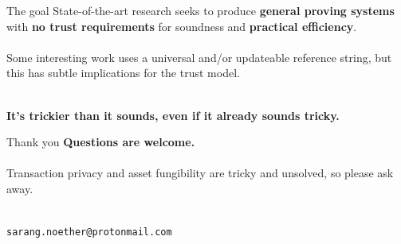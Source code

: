 \documentclass[aspectratio=169]{beamer}
\begin{document}
\begin{frame}{The goal}
State-of-the-art research seeks to produce \textbf{general proving systems} with \textbf{no trust requirements} for soundness and \textbf{practical efficiency}. \\~\\

Some interesting work uses a universal and/or updateable reference string, but this has subtle implications for the trust model. \\~\\

\begin{center}
\textbf{It's trickier than it sounds, even if it already sounds tricky.}
\end{center}
\end{frame}


\begin{frame}{Thank you}
\textbf{Questions are welcome.} \\~\\

Transaction privacy and asset fungibility are tricky and unsolved, so please ask away. \\~\\

\begin{center}
\Large \texttt{sarang.noether@protonmail.com}
\end{center}
\end{frame}
\end{document}
